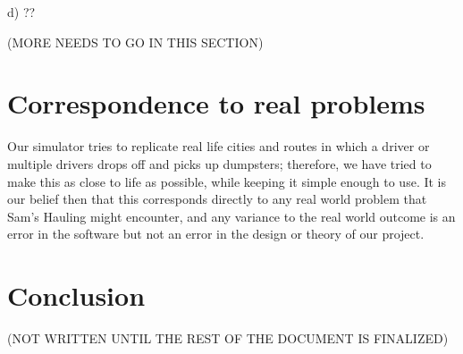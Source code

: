 \documentclass{article}
\begin{document}
d) ??

(MORE NEEDS TO GO IN THIS SECTION)

\section{Correspondence to real problems}

Our simulator tries to replicate real life cities and routes in which a driver or multiple drivers drops off and picks up dumpsters; therefore, we have tried to make this as close to life as possible, while keeping it simple enough to use.  It is our belief then that this corresponds directly to any real world problem that Sam's Hauling might encounter, and any variance to the real world outcome is an error in the software but not an error in the design or theory of our project.


\section{Conclusion}

(NOT WRITTEN UNTIL THE REST OF THE DOCUMENT IS FINALIZED)
\end{document}
